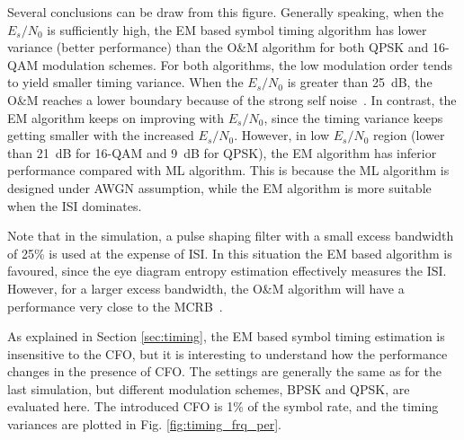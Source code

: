 \documentclass[journal,comsoc]{IEEEtran}
\begin{document}
Several conclusions can be draw from this figure.
Generally speaking, when the  \(E_s/N_0\) is sufficiently high, the EM based symbol timing algorithm has lower variance (better performance) than the O\&M algorithm for both QPSK and 16-QAM modulation schemes.
For both algorithms, the low modulation order tends to yield smaller timing variance.
When the \(E_s/N_0\) is greater than 25~dB, the O\&M reaches a lower boundary because of the strong self noise~\cite{mengali1997synchronization}. 
% 
% 
In contrast, the EM algorithm keeps on improving with \(E_s/N_0\), since the timing variance keeps getting smaller with the increased \(E_s/N_0\).
However, in low \(E_s/N_0\) region (lower than 21~dB for 16-QAM and 9~dB for QPSK), the EM algorithm has inferior performance compared with ML algorithm.
This is because the ML algorithm is designed under AWGN assumption, while the EM algorithm is more suitable when the ISI dominates.


Note that in the simulation, a pulse shaping filter with a small excess bandwidth of 25\% is used at the expense of ISI.
In this situation the EM based algorithm is favoured, since the eye diagram entropy estimation effectively measures the ISI.
However, for a larger excess bandwidth, the O\&M algorithm will have a performance very close to the MCRB~\cite{mengali1997synchronization}.
% 
% 

As explained in Section \ref{sec:timing}, the EM based symbol timing estimation is insensitive to the CFO, but it is interesting to understand how the performance changes in the presence of CFO. 
The settings are generally the same as for the last simulation, but different modulation schemes, BPSK and QPSK,  are evaluated here.
The introduced CFO is 1\% of the symbol rate, and the timing variances are plotted in Fig. \ref{fig:timing_frq_per}.
\end{document}

